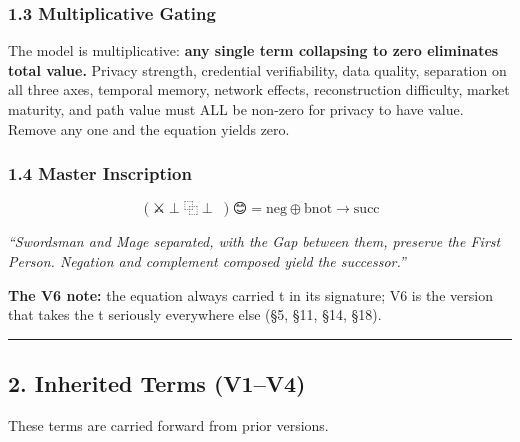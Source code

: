 \documentclass[
]{article}
\begin{document}
\subsubsection{1.3 Multiplicative Gating}\label{multiplicative-gating}

The model is multiplicative: \textbf{any single term collapsing to zero
eliminates total value.} Privacy strength, credential verifiability,
data quality, separation on all three axes, temporal memory, network
effects, reconstruction difficulty, market maturity, and path value must
ALL be non-zero for privacy to have value. Remove any one and the
equation yields zero.

\subsubsection{1.4 Master Inscription}\label{master-inscription}

\[(\text{⚔️} \perp \text{⿻} \perp \text{🧙})\text{😊} = \text{neg} \oplus \text{bnot} \to \text{succ}\]

\emph{``Swordsman and Mage separated, with the Gap between them,
preserve the First Person. Negation and complement composed yield the
successor.''}

\textbf{The V6 note:} the equation always carried t in its signature; V6
is the version that takes the t seriously everywhere else (§5, §11, §14,
§18).

\begin{center}\rule{0.5\linewidth}{0.5pt}\end{center}

\subsection{2. Inherited Terms (V1--V4)}\label{inherited-terms-v1v4}

These terms are carried forward from prior versions.
\end{document}
